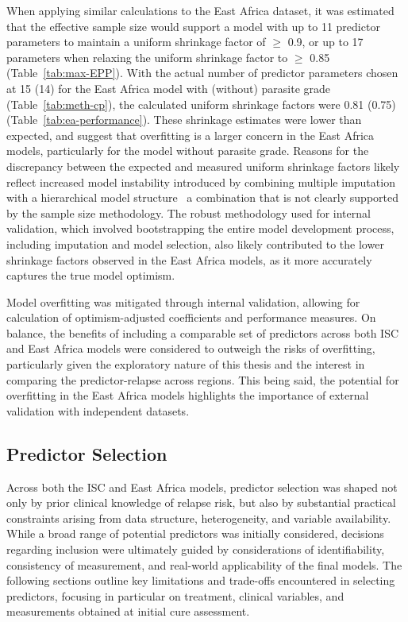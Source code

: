 When applying similar calculations to the East Africa dataset, it was estimated that the effective sample size would support a model with up to 11 predictor parameters to maintain a uniform shrinkage factor of $\geq$ 0.9, or up to 17 parameters when relaxing the uniform shrinkage factor to $\geq$ 0.85 (Table~\ref{tab:max-EPP}). With the actual number of predictor parameters chosen at 15 (14) for the East Africa model with (without) parasite grade (Table~\ref{tab:meth-cp}), the calculated uniform shrinkage factors were 0.81 (0.75) (Table~\ref{tab:ea-performance}). These shrinkage estimates were lower than expected, and suggest that overfitting is a larger concern in the East Africa models, particularly for the model without parasite grade. Reasons for the discrepancy between the expected and measured uniform shrinkage factors likely reflect increased model instability introduced by combining multiple imputation with a hierarchical model structure \textemdash\ a combination that is not clearly supported by the sample size methodology\cite{riley2019B}. The robust methodology used for internal validation, which involved bootstrapping the entire model development process, including imputation and model selection, also likely contributed to the lower shrinkage factors observed in the East Africa models, as it more accurately captures the true model optimism\cite{moons2015}.

Model overfitting was mitigated through internal validation, allowing for calculation of optimism-adjusted coefficients and performance measures. On balance, the benefits of including a comparable set of predictors across both ISC and East Africa models were considered to outweigh the risks of overfitting, particularly given the exploratory nature of this thesis and the interest in comparing the predictor-relapse across regions. This being said, the potential for overfitting in the East Africa models highlights the importance of external validation with independent datasets.

\subsection{Predictor Selection}

Across both the ISC and East Africa models, predictor selection was shaped not only by prior clinical knowledge of relapse risk, but also by substantial practical constraints arising from data structure, heterogeneity, and variable availability. While a broad range of potential predictors was initially considered, decisions regarding inclusion were ultimately guided by considerations of identifiability, consistency of measurement, and real-world applicability of the final models. The following sections outline key limitations and trade-offs encountered in selecting predictors, focusing in particular on treatment, clinical variables, and measurements obtained at initial cure assessment.

